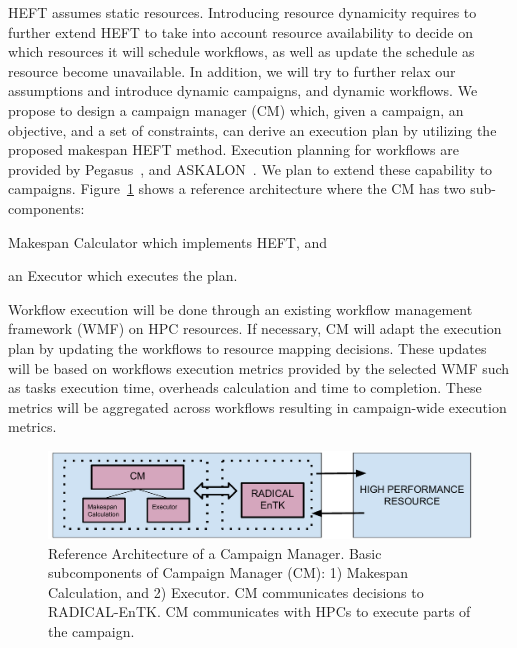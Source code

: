 HEFT assumes static resources.
Introducing resource dynamicity requires to further extend HEFT to take into account resource availability to decide on which resources it will schedule workflows, as well as update the schedule as resource become unavailable.
In addition, we will try to further relax our assumptions and introduce dynamic campaigns, and dynamic workflows.
We propose to design a campaign manager (CM) which, given a campaign, an objective, and a set of constraints, can derive an execution plan by utilizing the proposed makespan HEFT method.
Execution planning for workflows are provided by Pegasus~\cite{deelman2015pegasus}, and ASKALON~\cite{fahringer2005askalon}.
We plan to extend these capability to campaigns.
Figure~\ref{fig:refarch} shows a reference architecture where the CM has two sub-components:
\begin{inparaenum}[(1)]
\item Makespan Calculator which implements HEFT, and
\item an Executor which executes the plan. 
\end{inparaenum}
Workflow execution will be done through an existing workflow management framework (WMF) on HPC resources.
If necessary, CM will adapt the execution plan by updating the workflows to resource mapping decisions. 
These updates will be based on workflows execution metrics provided by the selected WMF such as tasks execution time, overheads calculation and time to completion.
These metrics will be aggregated across workflows resulting in campaign-wide execution metrics.

\begin{figure}[t]
    \centering
    \includegraphics[width=.95\textwidth]{figures/CEM_RefArch.pdf}
    \caption{Reference Architecture of a Campaign Manager. Basic 
    subcomponents of Campaign Manager (CM): 1) Makespan Calculation, and 2) Executor. 
    CM communicates decisions to RADICAL-EnTK. CM communicates with HPCs to 
    execute parts of the campaign.}\label{fig:refarch}
\end{figure}

